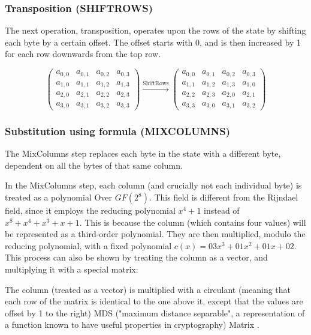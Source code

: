 \documentclass[12pt, a4paper]{report}
\theoremstyle{definition}
\theoremstyle{remark}
\begin{document}
\subsubsection{Transposition (SHIFTROWS)}
The next operation, transposition, operates upon the rows of the state by shifting each byte by a certain offset. The offset starts with 0, and is then increased by 1 for each row downwards from the top row.

\[ \left( \begin{array}{cccc}
a_{0,0} & a_{0,1} & a_{0,2} & a_{0,3} \\
a_{1,0} & a_{1,1} & a_{1,2} & a_{1,3} \\
a_{2,0} & a_{2,1} & a_{2,2} & a_{2,3} \\
a_{3,0} & a_{3,1} & a_{3,2} & a_{3,3}\end{array} \right)
\xrightarrow{\text{ShiftRows}}
\left( \begin{array}{cccc}
a_{0,0} & a_{0,1} & a_{0,2} & a_{0,3} \\
a_{1,1} & a_{1,2} & a_{1,3} & a_{1,0} \\
a_{2,2} & a_{2,3} & a_{2,0} & a_{2,1} \\
a_{3,3} & a_{3,0} & a_{3,1} & a_{3,2}\end{array} \right)
\]

\subsubsection{Substitution using formula (MIXCOLUMNS)}
\label{MixColumns}
The MixColumns step replaces each byte in the state with a different byte, dependent on all the bytes of that same column.

In the MixColumns step, each column (and crucially not each individual byte) is treated as a polynomial Over $GF(2^8)$. This field is different from the Rijndael field, since it employs the reducing polynomial $x^4+1$ instead of $x^8+x^4+x^3+x+1$. This is because the column (which contains four values) will be represented as a third-order polynomial\cite{Rijndael}.
They are then multiplied, modulo the reducing polynomial, with a fixed polynomial $c(x)=03x^3+01x^2+01x+02$. This process can also be shown by treating the column as a vector, and multiplying it with a special matrix:

The column (treated as a vector) is multiplied with a circulant (meaning that each row of the matrix is identical to the one above it, except that the values are offset by 1 to the right) MDS ("maximum distance separable", a representation of a function known to have useful properties in cryptography) Matrix \cite{MixColumns}.
\end{document}
